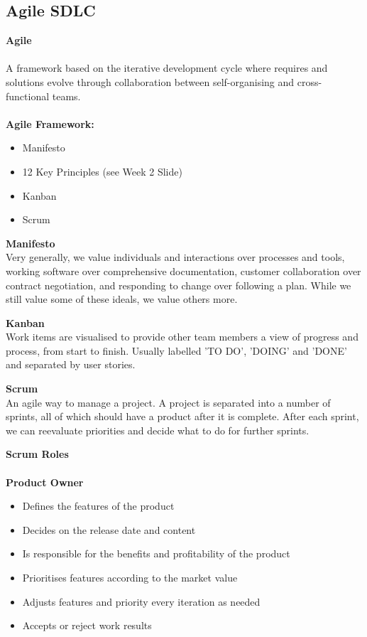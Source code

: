 \documentclass[a4paper,10pt]{article}
\begin{document}
\subsection*{Agile SDLC}
\textcolor{BlueGreen}{\textbf{Agile}} \\\\
A framework based on the iterative development cycle where requires and solutions evolve through collaboration between self-organising and cross-functional teams. \\\\
\textcolor{BlueGreen}{\textbf{Agile Framework:}} 
\begin{itemize}
	\item Manifesto 
	\item 12 Key Principles (see Week 2 Slide)
	\item Kanban
	\item Scrum
\end{itemize}
\begin{shaded}
\noindent \textcolor{BlueGreen}{\textbf{Manifesto}} \\
Very generally, we value individuals and interactions over processes and tools, working software over comprehensive documentation, customer collaboration over contract negotiation, and responding to change over following a plan. While we still value some of these ideals, we value others more. 
\end{shaded}
\begin{shaded}
\noindent \textcolor{BlueGreen}{\textbf{Kanban}} \\
Work items are visualised to provide other team members a view of progress and process, from start to finish. Usually labelled 'TO DO', 'DOING' and 'DONE' and separated by user stories. 
\end{shaded}
\begin{shaded}
\noindent \textcolor{BlueGreen}{\textbf{Scrum}} \\
An agile way to manage a project. A project is separated into a number of sprints, all of which should have a product after it is complete. After each sprint, we can reevaluate priorities and decide what to do for further sprints.
\end{shaded}
\textcolor{BlueGreen}{\textbf{Scrum Roles}}\\\\
\textbf{Product Owner}
\begin{itemize}
	\item Defines the features of the product 
	\item Decides on the release date and content 
	\item Is responsible for the benefits and profitability of the product 
	\item Prioritises features according to the market value
	\item Adjusts features and priority every iteration as needed 
	\item Accepts or reject work results
\end{itemize}
\end{document}
